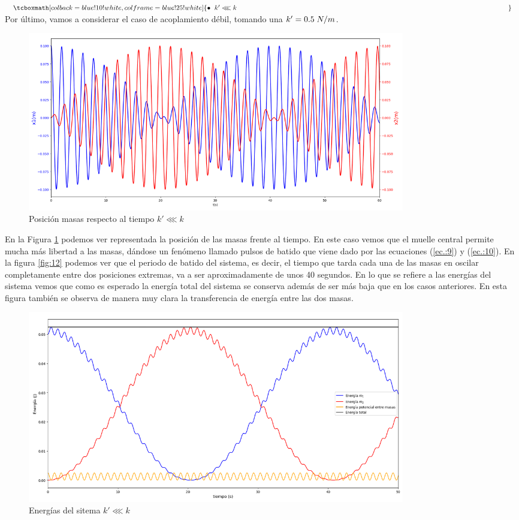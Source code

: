 \documentclass{article}
\begin{document}
$\tcboxmath[colback=blue!10!white,colframe=blue!25!white]{\bullet\hspace{0.2cm} k'\lll k\hspace{14cm}}\label{ec.:4}$\newline\linebreak
Por último, vamos a considerar el caso de acoplamiento débil, tomando una $k'=0.5\hspace{0.1cm}N/m$.
\begin{figure}[H]
    \centering
    \includegraphics[width=0.8\textwidth]{posicion_k_mas_menor}
\caption{Posición masas respecto al tiempo $k'\lll k$}
\label{fig:9}
\end{figure}
En la Figura \ref{fig:9} podemos ver representada la posición de las masas frente al tiempo. En este caso vemos que el muelle central permite mucha más libertad a las masas, dándose un fenómeno llamado pulsos de batido que viene dado por las ecuaciones (\ref{ec.:9}) y (\ref{ec.:10}). En la figura \ref{fig:12} podemos ver que el periodo de batido del sistema, es decir, el tiempo que tarda cada una de las masas en oscilar completamente entre dos posiciones extremas, va a ser aproximadamente de unos 40 segundos.\newline\linebreak
En lo que se refiere a las energías del sistema vemos que como es esperado la energía total del sistema se conserva además de ser más baja que en los casos anteriores. En esta figura también se observa de manera muy clara la transferencia de energía entre las dos masas.
\begin{figure}[H]
    \centering
    \includegraphics[width=0.8\textwidth]{energias_k_mas_menor}
\caption{Energías del sitema $k'\lll k$}
\label{fig:10}
\end{figure}
\end{document}
